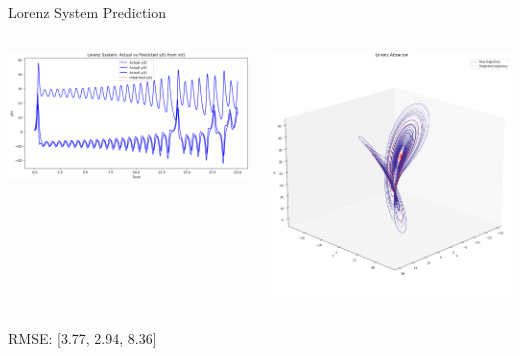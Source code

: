 \documentclass{beamer}
\begin{document}
\begin{frame}{Lorenz System Prediction}
  \begin{columns}
    \includegraphics[width=\textwidth]{figures/lorentz_pendulum_1.png}
    
    \includegraphics[width=\textwidth]{figures/lorentz_pendulum_2.png}
  \end{columns}
  \begin{center}
    RMSE: [3.77, 2.94, 8.36]
  \end{center}
\end{frame}
\end{document}
